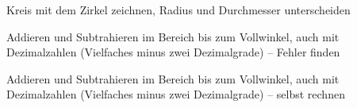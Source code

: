 \begin{aufgabe}{Kreis mit dem Zirkel zeichnen, Radius und Durchmesser unterscheiden}
\end{aufgabe}

\begin{aufgabe}{Addieren und Subtrahieren im Bereich bis zum Vollwinkel, auch mit Dezimalzahlen (Vielfaches minus zwei Dezimalgrade) – Fehler finden}
\end{aufgabe}

\begin{aufgabe}{Addieren und Subtrahieren im Bereich bis zum Vollwinkel, auch mit Dezimalzahlen (Vielfaches minus zwei Dezimalgrade) – selbst rechnen}
\end{aufgabe}
